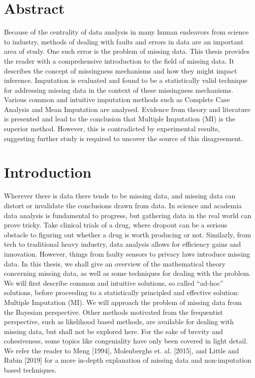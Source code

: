 \documentclass{article}
\begin{document}
	
	\maketitle
	
	\section*{Abstract}
	Because of the centrality of data analysis in many human endeavors from science to industry, methods of dealing with faults and errors in data are an important area of study. One such error is the problem of missing data. This thesis provides the reader with a comprehensive introduction to the field of missing data. It describes the concept of missingness mechanisms and how they might impact inference. Imputation is evaluated and found to be a statistically valid technique for addressing missing data in the context of these missingness mechanisms. Various common and intuitive imputation methods such as Complete Case Analysis and Mean Imputation are analysed. Evidence from theory and literature is presented and lead to the conclusion that Multiple Imputation (MI) is the superior method. However, this is contradicted by experimental results, suggesting further study is required to uncover the source of this disagreement. 
	
	\section{Introduction}
	Wherever there is data there tends to be missing data, and missing data can distort or invalidate the conclusions drawn from data. In science and academia data analysis is fundamental to progress, but gathering data in the real world can prove tricky. Take clinical trials of a drug, where dropout can be a serious obstacle to figuring out whether a drug is worth producing or not. Similarly, from tech to traditional heavy industry, data analysis allows for efficiency gains and innovation. However, things from faulty sensors to privacy laws introduce missing data. In this thesis, we shall give an overview of the mathematical theory concerning missing data, as well as some techniques for dealing with the problem. We will first describe common and intuitive solutions, so called \enquote{ad-hoc} solutions, before proceeding to a statistically principled and effective solution: Multiple Imputation (MI). We will approach the problem of missing data from the Bayesian perspective. Other methods motivated from the frequentist perspective, such as likelihood based methods, are available for dealing with missing data, but shall not be explored here. For the sake of brevity and cohesiveness, some topics like congeniality have only been covered in light detail. We refer the reader to Meng [1994], Molenberghs et. al. [2015], and Little and Rubin [2019] for a more in-depth explanation of missing data and non-imputation based techniques.
\end{document}
